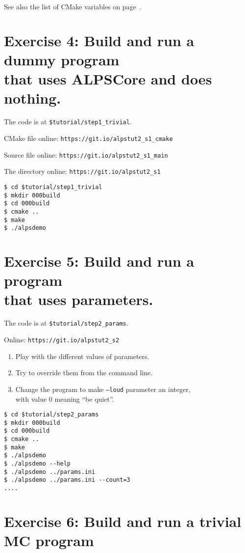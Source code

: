 \documentclass[12pt]{article}
\newcommand{\code}[1]{\texttt{#1}}
\begin{document}
See also the list of CMake variables on page~\pageref{ref:cmakevars}.

\section{Exercise 4: Build and run a dummy program\\ that uses ALPSCore and does nothing.}

The code is at \texttt{\color{ballblue}\$tutorial/step1\_trivial}.

CMake file online: \nolinkurl{https://git.io/alpstut2_s1_cmake}

Source file online: \nolinkurl{https://git.io/alpstut2_s1_main}

The directory online: \nolinkurl{https://git.io/alpstut2_s1}

\begin{lstlisting}[emph={cd,mkdir}]
$ cd $tutorial/step1_trivial
$ mkdir 000build
$ cd 000build
$ cmake ..
$ make
$ ./alpsdemo
\end{lstlisting}%

\section{Exercise 5: Build and run a program\\ that uses parameters.}

The code is at \texttt{\color{ballblue}\$tutorial/step2\_params}.

Online: \nolinkurl{https://git.io/alpstut2_s2}

\begin{enumerate}
\item Play with the different values of parameters.
\item Try to override them from the command line.
\item Change the program to make \code{--loud} parameter an integer,\\
      with value 0 meaning ``be quiet''.
\end{enumerate}

\begin{lstlisting}[emph={cd,mkdir}]
$ cd $tutorial/step2_params
$ mkdir 000build
$ cd 000build
$ cmake ..
$ make
$ ./alpsdemo
$ ./alpsdemo --help
$ ./alpsdemo ../params.ini
$ ./alpsdemo ../params.ini --count=3
....
\end{lstlisting}

\section{Exercise 6: Build and run a trivial MC program}
\end{document}
